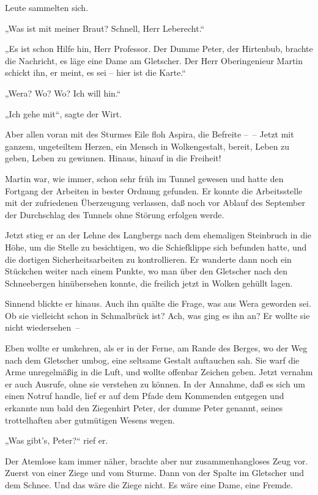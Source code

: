 Leute sammelten sich.

„Was ist mit meiner Braut? Schnell, Herr Leberecht.“

„Es ist schon Hilfe hin, Herr Professor. Der Dumme Peter, der
Hirtenbub, brachte die Nachricht, es läge eine Dame am Gletscher.
Der Herr Oberingenieur Martin schickt ihn, er meint, es sei – hier
ist die Karte.“

„Wera? Wo? Wo? Ich will hin.“

„Ich gehe mit“, sagte der Wirt.

Aber allen voran mit des Sturmes Eile floh Aspira, die Befreite –~–
Jetzt mit ganzem, ungeteiltem Herzen, ein Mensch in Wolkengestalt,
bereit, Leben zu geben, Leben zu gewinnen. Hinaus, hinauf in die
Freiheit!

Martin war, wie immer, schon sehr früh im Tunnel gewesen und hatte
den Fortgang der Arbeiten in bester Ordnung gefunden. Er konnte die
Arbeitsstelle mit der zufriedenen Überzeugung verlassen, daß noch
vor Ablauf des September der Durchschlag des Tunnels ohne Störung
erfolgen werde.

Jetzt stieg er an der Lehne des Langbergs nach dem ehemaligen
Steinbruch in die Höhe, um die Stelle zu besichtigen, wo die
Schiefklippe sich befunden hatte, und die dortigen
Sicherheitsarbeiten zu kontrollieren. Er wanderte dann noch ein
Stückchen weiter nach einem Punkte, wo man über den Gletscher nach
den Schneebergen hinübersehen konnte, die freilich jetzt in Wolken
gehüllt lagen.

Sinnend blickte er hinaus. Auch ihn quälte die Frage, was aus Wera
geworden sei. Ob sie vielleicht schon in Schmalbrück ist? Ach, was
ging es ihn an? Er wollte sie nicht wiedersehen~–

Eben wollte er umkehren, als er in der Ferne, am Rande des Berges,
wo der Weg nach dem Gletscher umbog, eine seltsame Gestalt
auftauchen sah. Sie warf die Arme unregelmäßig in die Luft, und
wollte offenbar Zeichen geben. Jetzt vernahm er auch Ausrufe, ohne
sie verstehen zu können. In der Annahme, daß es sich um einen
Notruf handle, lief er auf dem Pfade dem Kommenden entgegen und
erkannte nun bald den Ziegenhirt Peter, der dumme Peter genannt,
seines trottelhaften aber gutmütigen Wesens wegen.

„Was gibt's, Peter?“ rief er.

Der Atemlose kam immer näher, brachte aber nur zusammenhangloses
Zeug vor. Zuerst von einer Ziege und vom Sturme. Dann von der
Spalte im Gletscher und dem Schnee. Und das wäre die Ziege nicht.
Es wäre eine Dame, eine Fremde.

